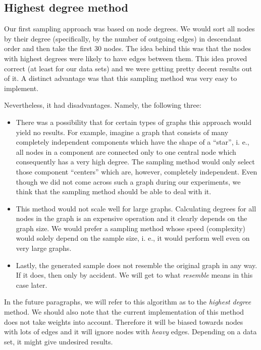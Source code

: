\subsection{Highest degree method}

Our first sampling approach was based on node degrees. We would sort all nodes by their degree (specifically, by the number of outgoing edges) in descendant order and then take the first 30 nodes. The idea behind this was that the nodes with highest degrees were likely to have edges between them. This idea proved correct (at least for our data sets) and we were getting pretty decent results out of it. A distinct advantage was that this sampling method was very easy to implement.

Nevertheless, it had disadvantages. Namely, the following three:

\begin{itemize}
\item There was a possibility that for certain types of graphs this approach would yield no results. For example, imagine a graph that consists of many completely independent components which have the shape of a “star”, i. e., all nodes in a component are connected only to one central node which consequently has a very high degree. The sampling method would only select those component “centers” which are,  however, completely independent. Even though we did not come across such a graph during our experiments, we think that the sampling method should be able to deal with it.
\item This method would not scale well for large graphs. Calculating degrees for all nodes in the graph is an expensive operation and it clearly depends on the graph size. We would prefer a sampling method whose speed (complexity) would solely depend on the sample size, i. e., it would perform well even on very large graphs.
\item Lastly, the generated sample does not resemble the original graph in any way. If it does, then only by accident. We will get to what \emph{resemble} means in this case later.

\end{itemize}
In the future paragraphs, we will refer to this algorithm as to the \emph{highest degree} method. We should also note that the current implementation of this method does not take weights into account. Therefore it will be biased towards nodes with lots of edges and it will ignore nodes with \emph{heavy} edges. Depending on a data set, it might give undesired results.

